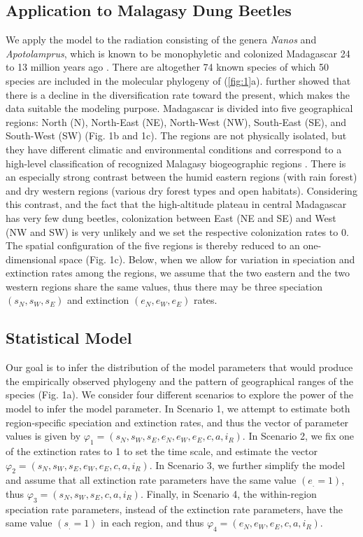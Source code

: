 \subsection*{Application to Malagasy Dung Beetles}
\noindent We apply the model to the radiation consisting of the genera \textit{Nanos} and \textit{Apotolamprus}, which is known to be monophyletic and colonized Madagascar 24 to 13 million years ago \citep{Miraldo2014}. 
There are altogether 74 known species \citep{Montreuil2014} of which 50 species are included in the molecular phylogeny of \citep{Miraldo2014} (\cref{fig:1}a). 
\citet{Miraldo2014} further showed that there is a decline in the diversification rate toward the present, which makes the data suitable the modeling purpose. 
Madagascar is divided into five geographical regions: North (N), North-East (NE), North-West (NW), South-East (SE), and South-West (SW) (Fig. 1b and 1c). 
The regions are not physically isolated, but they have different climatic and environmental conditions and correspond to a high-level classification of recognized Malagasy biogeographic regions \citep{Wilme2006}. 
There is an especially strong contrast between the humid eastern regions (with rain forest) and dry western regions (various dry forest types and open habitats). 
Considering this contrast, and the fact that the high-altitude plateau in central Madagascar has very few dung beetles, colonization between East (NE and SE) and West (NW and SW) is very unlikely and we set the respective colonization rates to 0. 
The spatial configuration of the five regions is thereby reduced to an one-dimensional space (Fig. 1c). Below, when we allow for variation in speciation and extinction rates among the regions, we assume that the two eastern and the two western regions share the same values, thus there may be three speciation $(s_N,s_W,s_E )$ and extinction $(e_N,e_W,e_E)$ rates.

\subsection*{Statistical Model}
\noindent Our goal is to infer the distribution of the model parameters that would produce the empirically observed phylogeny and the pattern of geographical ranges of the species (Fig. 1a). 
We consider four different scenarios to explore the power of the model to infer the model parameter. 
In Scenario 1, we attempt to estimate both region-specific speciation and extinction rates, and thus the vector of parameter values is given by $\varphi_1=(s_N,s_W, s_E, e_N,e_W,e_E,c,a,i_R)$. 
In Scenario 2, we fix one of the extinction rates to 1 to set the time scale, and estimate the vector  $\varphi_2=(s_N,s_W, s_E, e_W,e_E,c,a,i_R)$.
In Scenario 3, we further simplify the model and assume that all extinction rate parameters have the same value $(e_. = 1)$, thus $\varphi_3=(s_N,s_W,s_E, c,a,i_R)$. 
Finally, in Scenario 4, the within-region speciation rate parameters, instead of the extinction rate parameters, have the same value $(s_. = 1)$ in each region, and thus $\varphi_4=(e_N,e_W,e_E,c,a,i_R)$. 

